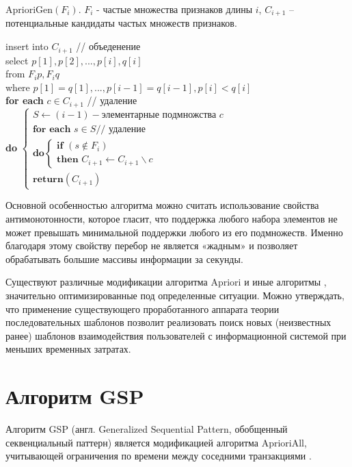 

AprioriGen$(F_i)$. $F_i$ - частые множества признаков длины $i$, $C_{i+1}$ -- потенциальные кандидаты частых множеств признаков.

\noindent
insert into $C_{i+1}$ // объеденение \\
select $p[1],p[2],...,p[i],q[i]$ \\
from $F_ip, F_iq$ \\
where $p[1]=q[1],...,p[i-1]=q[i-1],p[i]<q[i]$ \\
\textbf{for each} $c \in C_{i+1}$ // удаление \\
\textbf{do}
$\begin{cases}
	S \leftarrow (i-1)-\text{элементарные подмножства } c\\
	\textbf{for each } s \in S \text{// удаление} \\
	\textbf{do} 
	\begin{cases}
		\textbf{if } (s \notin F_i)\\
		\textbf{then } C_{i+1} \leftarrow C_{i+1} \backslash c
	\end{cases} \\
	\textbf{return} (C_{i+1})
\end{cases}$

Основной особенностью алгоритма можно считать использование свойства антимонотонности, которое гласит, что поддержка любого набора элементов не может превышать минимальной поддержки любого из его подмножеств. Именно благодаря этому свойству перебор не является «жадным» и позволяет обрабатывать большие массивы информации за секунды.

Существуют различные модификации алгоритма Apriori и иные алгоритмы \cite{35}, значительно оптимизированные под определенные ситуации. Можно утверждать, что применение существующего проработанного аппарата теории последовательных шаблонов позволит реализовать поиск новых (неизвестных ранее) шаблонов взаимодействия пользователей с информационной системой при меньших временных затратах.

\section{Алгоритм GSP}
Алгоритм GSP (англ. Generalized Sequential Pattern, обобщенный секвенциальный паттерн) является модификацией алгоритма AprioriAll, учитывающей ограничения по времени между соседними транзакциями \cite{1_, 32_}.

